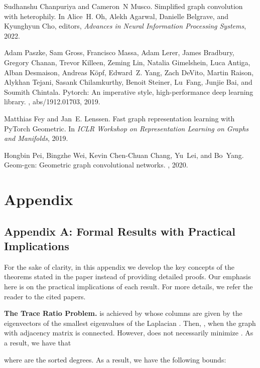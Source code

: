 \documentclass{article}
\theoremstyle{plain}
\theoremstyle{definition}
\begin{document}
{\begin{thebibliography}{10}
Sudhanshu Chanpuriya and Cameron~N Musco.
\newblock Simplified graph convolution with heterophily.
\newblock In Alice~H. Oh, Alekh Agarwal, Danielle Belgrave, and Kyunghyun Cho,
  editors, {\em Advances in Neural Information Processing Systems}, 2022.

Adam Paszke, Sam Gross, Francisco Massa, Adam Lerer, James Bradbury, Gregory
  Chanan, Trevor Killeen, Zeming Lin, Natalia Gimelshein, Luca Antiga, Alban
  Desmaison, Andreas K{\"{o}}pf, Edward~Z. Yang, Zach DeVito, Martin Raison,
  Alykhan Tejani, Sasank Chilamkurthy, Benoit Steiner, Lu~Fang, Junjie Bai, and
  Soumith Chintala.
\newblock Pytorch: An imperative style, high-performance deep learning library.
, abs/1912.01703, 2019.

Matthias Fey and Jan~E. Lenssen.
\newblock Fast graph representation learning with {PyTorch Geometric}.
\newblock In {\em ICLR Workshop on Representation Learning on Graphs and
  Manifolds}, 2019.

Hongbin Pei, Bingzhe Wei, Kevin Chen-Chuan Chang, Yu~Lei, and Bo~Yang.
\newblock Geom-gcn: Geometric graph convolutional networks.
, 2020.

\end{thebibliography}

}
\newpage
\section{Appendix}\label{appendix}
\subsection{Appendix A: Formal Results with Practical Implications}
For the sake of clarity, in this appendix we develop the key concepts of the theorems stated in the paper instead of providing detailed proofs. Our emphasis here is on the practical implications of each result. For more details, we refer the reader to the cited papers. 

\textbf{The Trace Ratio Problem.} 
 is achieved by  whose  columns are given by the eigenvectors of the  smallest eigenvalues  of the Laplacian . Then, , when the graph  with adjacency matrix  is connected. However,  does not necessarily minimize  . As a result, we have that 

where  are the sorted degrees. As a result, we have the following bounds: 
\end{document}
